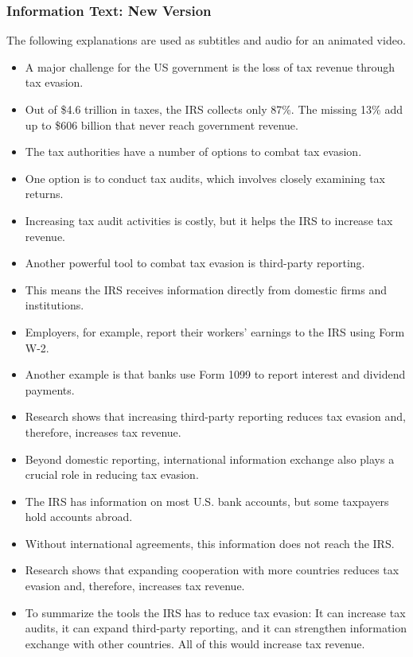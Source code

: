 \documentclass[11pt]{article}
\begin{document}
\subsubsection*{Information Text: New Version}
The following explanations are used as subtitles and audio for an animated video.
\begin{itemize}
\item A major challenge for the US government is the loss of tax revenue through tax evasion.
\item Out of \$4.6 trillion in taxes, the IRS collects only 87\%. The missing 13\% add up to \$606 billion that never reach government revenue. 
\item The tax authorities have a number of options to combat tax evasion.
\item One option is to conduct tax audits, which involves closely examining tax returns.
\item Increasing tax audit activities is costly, but it helps the IRS to increase tax revenue.
\item Another powerful tool to combat tax evasion is third-party reporting. 
\item This means the IRS receives information directly from domestic firms and institutions.
\item Employers, for example, report their workers’ earnings to the IRS using Form W-2.
\item Another example is that banks use Form 1099 to report interest and dividend payments. 
\item Research shows that increasing third-party reporting reduces tax evasion and, therefore, increases tax revenue.
\item Beyond domestic reporting, international information exchange also plays a crucial role in reducing tax evasion. 
\item The IRS has information on most U.S. bank accounts, but some taxpayers hold accounts abroad.
\item Without international agreements, this information does not reach the IRS.
\item Research shows that expanding cooperation with more countries reduces tax evasion and, therefore, increases tax revenue.
\item To summarize the tools the IRS has to reduce tax evasion: It can increase tax audits, it can expand third-party reporting, and it can strengthen information exchange with other countries. All of this would increase tax revenue. 
\end{itemize}
\end{document}

